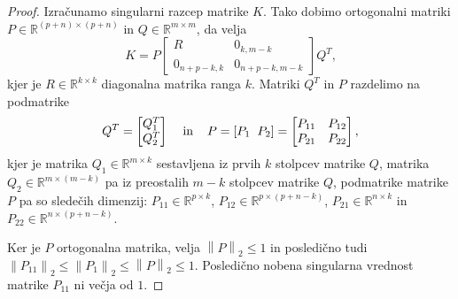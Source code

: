 \documentclass[mat1]{article}
\newcommand{\norm}[1]{\left\lVert#1\right\rVert}
\theoremstyle{definition}
\begin{document}
\begin{proof}
Izračunamo singularni razcep matrike  $K$. Tako dobimo ortogonalni matriki $P \in \mathbb{R}^{(p+n) \times (p+n)}$ in $Q \in \mathbb{R}^{m \times m}$, da velja 
\begin{equation}K = 
P
\begin{bmatrix} 
R & 0_{k, m-k} \\
0_{n+p-k, k} & 0_{n+p-k, m-k} 
\end{bmatrix} \label{eq:5}
Q^T
\text{,}
\end{equation}
kjer je $R \in \mathbb{R}^{k \times k}$ diagonalna matrika ranga $k$. Matriki $Q^T$ in $P$ razdelimo na podmatrike
$$  Q^T = 
\begin{bmatrix}
Q_1^T\\
Q_2^T
\end{bmatrix}
\hspace{4mm} \text{in} \hspace{4mm}
P = \left[P_1 \hspace{2mm} P_2 \right]
=
\begin{bmatrix} 
P_{11} & P_{12} \\
P_{21} & P_{22} 
\end{bmatrix},
$$
kjer je matrika $Q_1 \in \mathbb{R}^{m \times k}$ sestavljena iz prvih $k$ stolpcev matrike $Q$, matrika $Q_2 \in \mathbb{R}^{m \times (m-k)}$ pa iz preostalih $m-k$ stolpcev matrike $Q$, podmatrike matrike $P$ pa so sledečih dimenzij: $P_{11} \in \mathbb{R}^{p \times k}$, $P_{12} \in \mathbb{R}^{p \times (p+n-k)}$, $P_{21} \in \mathbb{R}^{n \times k}$ in $P_{22} \in \mathbb{R}^{n \times (p+n-k)}$.

Ker je $P$ ortogonalna matrika, velja $\norm{P}_2 \leq 1$ in posledično tudi $\norm{P_{11}}_2 \leq \norm{P_{1}}_2 \leq \norm{P}_2 \leq 1$. Posledično nobena singularna vrednost matrike $P_{11}$ ni večja od $1$. %


\end{proof}
\end{document}
